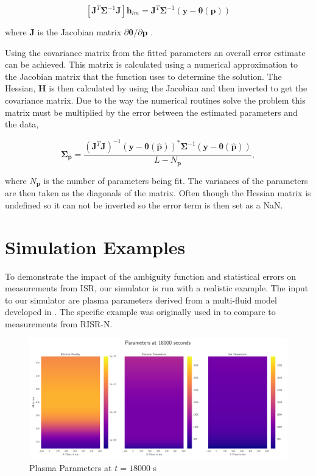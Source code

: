 \documentclass[draft,ras]{agutex}
\begin{document}
\begin{article}
\begin{equation}
\left[ \mathbf{J}^T\bm{\Sigma}^{-1}\mathbf{J}\right]\mathbf{h}_{lm} =\mathbf{J}^T\bm{\Sigma}^{-1}(\mathbf{y}-\bm{\theta}(\mathbf{p}))
\label{hlm}
\end{equation}

\noindent where $\mathbf{J}$ is the Jacobian matrix $\partial \bm{\theta}/\partial \mathbf{p}$ \citep{levenberg1944,marquardt:1963}. 

Using the covariance matrix from the fitted parameters an overall error estimate can be achieved. This matrix is calculated using a numerical approximation to the Jacobian matrix that the function uses to determine the solution. The Hessian, $\mathbf{H}$ is then calculated by using the Jacobian and then inverted to get the covariance matrix. Due to the way the numerical routines solve the problem this matrix must be multiplied by the error between the estimated parameters and the data,

\begin{equation}
\label{eqn:jacinv}
\bm{\Sigma}_{\hat{\mathbf{p}}}=\frac{(\mathbf{J}^T\mathbf{J})^{-1} (\mathbf{y}-\bm{\theta}(\hat{\mathbf{p}}))^*\bm{\Sigma}^{-1}(\mathbf{y}-\bm{\theta}(\hat{\mathbf{p}}))}{L-N_{\mathbf{p}}},
\end{equation}

\noindent where $N_{\mathbf{p}}$ is the number of parameters being fit. The variances of the parameters are then taken as the diagonals of the matrix. Often though the Hessian matrix is undefined so it can not be inverted so the error term is then set as a NaN.

\section{Simulation Examples}
To demonstrate the impact of the ambiguity function and statistical errors on measurements from ISR, our simulator is run with a realistic example. The input to our simulator are plasma parameters derived from a multi-fluid model developed in \cite{semeter:plasmatransport2012}. The specific example was originally used in \cite{Perry:2015jf} to compare to measurements from RISR-N.


\begin{figure}[!t]
\centering
\includegraphics[width=5in]{000_inputdata}
\caption{Plasma Parameters at $t=18000$ s}
\label{fig:plparamst0}
\end{figure}


\end{article}
\end{document}
